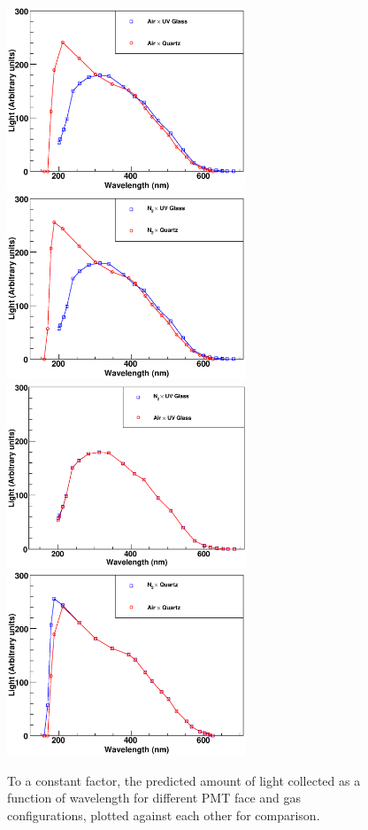 \begin{figure}
\vspace{0.5cm}
\begin{centering}
\includegraphics[height=5.5cm]{PMT-studies/pmt_6.eps}
\includegraphics[height=5.5cm]{PMT-studies/pmt_5.eps}
\includegraphics[height=5.5cm]{PMT-studies/pmt_3.eps}
\includegraphics[height=5.5cm]{PMT-studies/pmt_4.eps}
\vspace{0.5cm}
\caption{\small{To a constant factor, the predicted amount of light collected 
as a function of wavelength for different PMT face and gas configurations,
plotted against each other for comparison.}}
\label{light_comparison}
\end{centering}
\end{figure}

